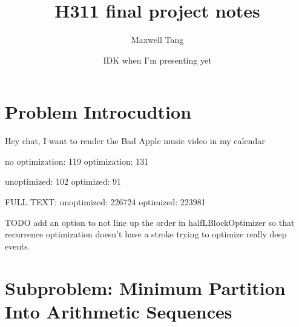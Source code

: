 \documentclass{article}
\title{H311 final project notes}
\author{Maxwell Tang}
\date{IDK when I'm presenting yet}
\begin{document}
\maketitle

\section*{Problem Introcudtion}
Hey chat, I want to render the Bad Apple music video in my calendar

no optimization: 119
optimization: 131

unoptimized: 102
optimized: 91

FULL TEXT:
unoptimized: 226724
optimized: 223981

TODO add an option to not line up the order in halfLBlockOptimizer so that recurrence optimization doesn't have a stroke trying to optimize really deep events.

\section*{Subproblem: Minimum Partition Into Arithmetic Sequences}
\end{document}
